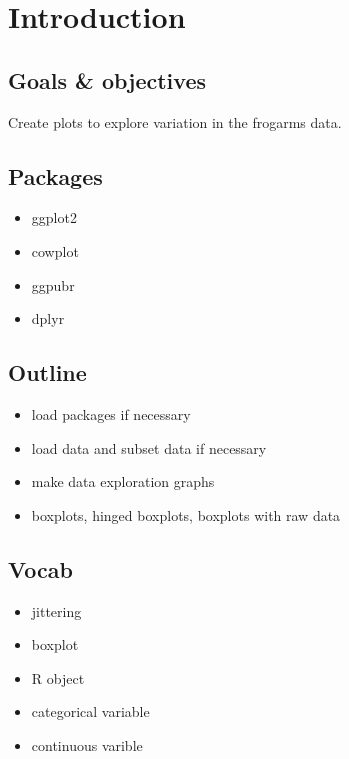 \documentclass[]{book}
\providecommand{\tightlist}{%
  \setlength{\itemsep}{0pt}\setlength{\parskip}{0pt}}
\theoremstyle{definition}
\theoremstyle{definition}
\theoremstyle{definition}
\theoremstyle{remark}
\begin{document}
\section{Introduction}\label{introduction-9}

\subsection{Goals \& objectives}\label{goals-objectives}

Create plots to explore variation in the frogarms data.

\subsection{Packages}\label{packages-8}

\begin{itemize}
\tightlist
\item
  ggplot2
\item
  cowplot
\item
  ggpubr
\item
  dplyr
\end{itemize}

\subsection{Outline}\label{outline-3}

\begin{itemize}
\tightlist
\item
  load packages if necessary
\item
  load data and subset data if necessary
\item
  make data exploration graphs
\item
  boxplots, hinged boxplots, boxplots with raw data
\end{itemize}

\subsection{Vocab}\label{vocab}

\begin{itemize}
\tightlist
\item
  jittering
\item
  boxplot
\item
  R object
\item
  categorical variable
\item
  continuous varible
\end{itemize}
\end{document}
